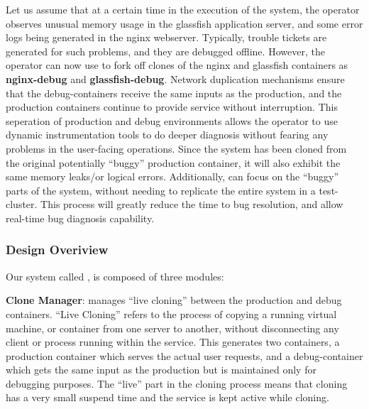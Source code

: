 Let us assume that at a certain time in the execution of the system, the operator observes unusual memory usage in the glassfish application server, and some error logs being generated in the nginx webserver. 
Typically, trouble tickets are generated for such problems, and they are debugged offline.
However, the operator can now use \parikshan to fork off clones of the nginx and glassfish containers as \textbf{nginx-debug} and \textbf{glassfish-debug}.
Network duplication mechanisms ensure that the debug-containers receive the same inputs as the production, and the production containers continue to provide service without interruption.
This seperation of production and debug environments allows the operator to use dynamic instrumentation tools to do deeper diagnosis without fearing any problems in the user-facing operations.
Since the system has been cloned from the original potentially ``buggy'' production container, it will also exhibit the same memory leaks/or logical errors.
Additionally, \parikshan can focus on the ``buggy'' parts of the system, without needing to replicate the entire system in a test-cluster. 
This process will greatly reduce the time to bug resolution, and allow real-time bug diagnosis capability.

\subsubsection{Design Overiview}
\label{sec:designBackground}

Our system called \parikshan, is composed of three modules: 


 \textbf{Clone Manager}: manages ``live cloning'' between the production and debug containers.
``Live Cloning'' refers to the process of copying a running virtual machine, or container from one server to another, without disconnecting any client or process running within the service.
This generates two containers, a production container which serves the actual user requests, and a debug-container which gets the same input as the production but is maintained only for debugging purposes.
The ``live'' part in the cloning process means that cloning has a very small suspend time and the service is kept active while cloning. \\

